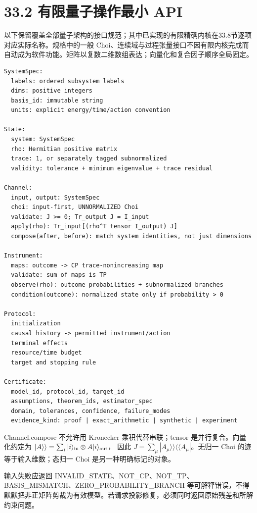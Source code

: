 \documentclass[
  11pt,
  oneside]{book}
\begin{document}
\section{33.2 有限量子操作最小 API}

以下保留覆盖全部量子架构的接口规范；其中已实现的有限精确内核在33.8节逐项对应实际名称。规格中的一般
Choi、连续域与过程张量接口不因有限内核完成而自动成为软件功能。矩阵以复数二维数组表达；向量化和复合因子顺序全局固定。

\begin{Verbatim}[breaklines,breakanywhere,fontsize=\scriptsize]
SystemSpec:
  labels: ordered subsystem labels
  dims: positive integers
  basis_id: immutable string
  units: explicit energy/time/action convention

State:
  system: SystemSpec
  rho: Hermitian positive matrix
  trace: 1, or separately tagged subnormalized
  validity: tolerance + minimum eigenvalue + trace residual

Channel:
  input, output: SystemSpec
  choi: input-first, UNNORMALIZED Choi
  validate: J >= 0; Tr_output J = I_input
  apply(rho): Tr_input[(rho^T tensor I_output) J]
  compose(after, before): match system identities, not just dimensions

Instrument:
  maps: outcome -> CP trace-nonincreasing map
  validate: sum of maps is TP
  observe(rho): outcome probabilities + subnormalized branches
  condition(outcome): normalized state only if probability > 0

Protocol:
  initialization
  causal history -> permitted instrument/action
  terminal effects
  resource/time budget
  target and stopping rule

Certificate:
  model_id, protocol_id, target_id
  assumptions, theorem_ids, estimator_spec
  domain, tolerances, confidence, failure_modes
  evidence_kind: proof | exact_arithmetic | synthetic | experiment
\end{Verbatim}

Channel.compose 不允许用 Kronecker 乘积代替串联；tensor
是并行复合。向量化约定为
\(|A\rangle\rangle=\sum_i|i\rangle_{\rm in}\otimes A|i\rangle_{\rm out}\)，
因此 \(J=\sum_\mu|A_\mu\rangle\rangle\langle\langle A_\mu|\)。无归一
Choi 的迹等于输入维数；态归一 Choi 是另一种明确标记的对象。

输入失败应返回
INVALID\_\allowbreak STATE、NOT\_\allowbreak CP、NOT\_\allowbreak TP、BASIS\_\allowbreak MISMATCH、ZERO\_\allowbreak PROBABILITY\_\allowbreak BRANCH
等可解释错误，不得默默把非正矩阵剪裁为有效模型。若请求投影修复，必须同时返回原始残差和所解约束问题。
\end{document}
